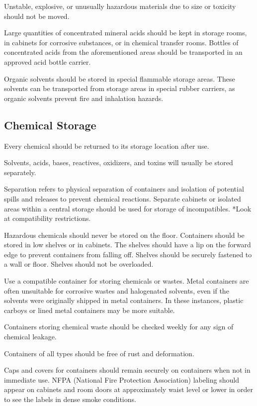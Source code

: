 \documentclass[12pt]{../SOP2}
\begin{document}
Unstable, explosive, or unusually hazardous materials due to size or toxicity should not be moved. 

Large quantities of concentrated mineral acids should be kept in storage rooms, in cabinets for corrosive substances, or in chemical transfer rooms. Bottles of concentrated acids from the aforementioned areas should be transported in an approved acid bottle carrier. 

Organic solvents should be stored in special flammable storage areas. These solvents can be transported from storage areas in special rubber carriers, as organic solvents prevent fire and inhalation hazards. 

\subsection{Chemical Storage}

Every chemical should be returned to its storage location after use. 

Solvents, acids, bases, reactives, oxidizers, and toxins will usually be stored separately.

Separation refers to physical separation of containers and isolation of potential spills and releases to prevent chemical reactions. Separate cabinets or isolated areas within a central storage should be used for storage of incompatibles. *Look at compatibility restrictions. 

Hazardous chemicals should never be stored on the floor. Containers should be stored in low shelves or in cabinets. The shelves should have a lip on the forward edge to prevent containers from falling off. Shelves should be securely fastened to a wall or floor. Shelves should not be overloaded.

Use a compatible container for storing chemicals or wastes. Metal containers are often unsuitable for corrosive wastes and halogenated solvents, even if the solvents were originally shipped in metal containers. In these instances, plastic carboys or lined metal containers may be more suitable. 

Containers storing chemical waste should be checked weekly for any sign of chemical leakage.

Containers of all types should be free of rust and deformation. 

Caps and covers for containers should remain securely on containers when not in immediate use.
NFPA (National Fire Protection Association) labeling should appear on cabinets and room doors at approximately waist level or lower in order to see the labels in dense smoke conditions.
\end{document}
